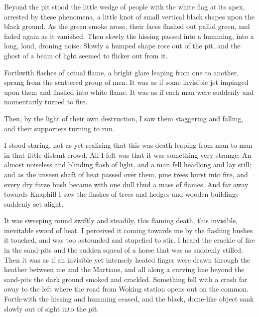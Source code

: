 Beyond the pit stood the little wedge of people with the white flag at its apex, arrested by these phenomena, a little knot of small vertical black shapes upon the black ground. As the green smoke arose, their faces flashed out pallid green, and faded again as it vanished. Then slowly the hissing passed into a humming, into a long, loud, droning noise. Slowly a humped shape rose out of the pit, and the ghost of a beam of light seemed to flicker out from it.

Forthwith flashes of actual flame, a bright glare leaping from one to another, sprang from the scattered group of men. It was as if some invisible jet impinged upon them and flashed into white flame. It was as if each man were suddenly and momentarily turned to fire.




Then, by the light of their own destruction, I saw them staggering and falling, and their supporters turning to run.

I stood staring, not as yet realising that this was death leaping from man to man in that little distant crowd. All I felt was that it was something very strange. An almost noiseless and blinding flash of light, and a man fell headlong and lay still; and as the unseen shaft of heat passed over them, pine trees burst into fire, and every dry furze bush became with one dull thud a mass of flames. And far away towards Knaphill I saw the flashes of trees and hedges and wooden buildings suddenly set alight.

It was sweeping round swiftly and steadily, this flaming death, this invisible, inevitable sword of heat. I perceived it coming towards me by the flashing bushes it touched, and was too astounded and stupefied to stir. I heard the crackle of fire in the sand-pits and the sudden squeal of a horse that was as suddenly stilled. Then it was as if an invisible yet intensely heated finger were drawn through the heather between me and the Martians, and all along a curving line beyond the sand-pits the dark ground smoked and crackled. Something fell with a crash far away to the left where the road from Woking station opens out on the common. Forth-with the hissing and humming ceased, and the black, dome-like object sank slowly out of sight into the pit.



